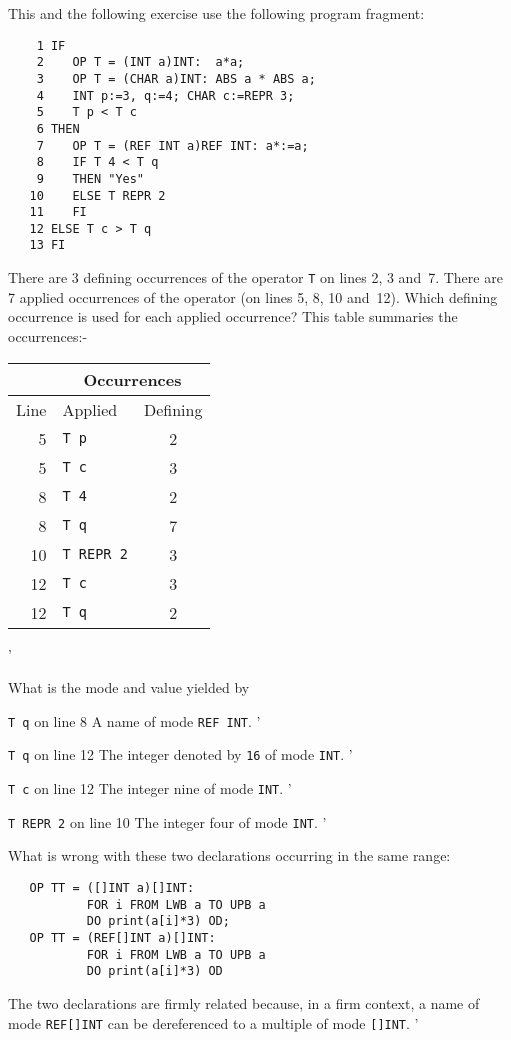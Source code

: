 \begin{exercise}
\item This and the following exercise use the following program
fragment:
\begin{verbatim}
    1 IF
    2    OP T = (INT a)INT:  a*a;
    3    OP T = (CHAR a)INT: ABS a * ABS a;
    4    INT p:=3, q:=4; CHAR c:=REPR 3;
    5    T p < T c
    6 THEN
    7    OP T = (REF INT a)REF INT: a*:=a;
    8    IF T 4 < T q
    9    THEN "Yes"
   10    ELSE T REPR 2
   11    FI
   12 ELSE T c > T q
   13 FI
\end{verbatim}
\noindent
There are 3 defining occurrences of the operator \verb|T| on lines 2,
3 and~7. There are 7 applied occurrences of the operator (on lines 5,
8, 10 and~12). Which defining occurrence is used for each applied
occurrence? \ans This table summaries the occurrences:-
\begin{center}
\begin{tabular}{|r|l|c|}\hline
      &\multicolumn{2}{c|}{Occurrences}\\ \hline
Line  &Applied&Defining\\ \hline
 5    &\texttt{T p}&2\\
 5    &\texttt{T c}&3\\
 8    &\texttt{T 4}&2\\
 8    &\texttt{T q}&7\\
10    &\texttt{T REPR 2}&3\\
12    &\texttt{T c}&3\\
12    &\texttt{T q}&2\\ \hline
\end{tabular}
\end{center}
'
\item What is the mode and value yielded by
\begin{subex}
\item \verb|T q| on line 8 \subans A name of mode \verb|REF INT|.
'
\item \verb|T q| on line 12 \subans The integer denoted by \verb|16| of
mode \verb|INT|.
'
\item \verb|T c| on line 12 \subans The integer nine of mode
\verb|INT|.
'
\item \verb|T REPR 2| on line 10 \subans The integer four of mode
\verb|INT|.
'
\end{subex}
\item What is wrong with these two declarations occurring in the same
range:
\begin{verbatim}
   OP TT = ([]INT a)[]INT:
           FOR i FROM LWB a TO UPB a
           DO print(a[i]*3) OD;
   OP TT = (REF[]INT a)[]INT:
           FOR i FROM LWB a TO UPB a
           DO print(a[i]*3) OD
\end{verbatim}
\indent\ans The two declarations are firmly related because, in a
firm context, a name of mode \verb|REF[]INT| can be dereferenced to a
multiple of mode \verb|[]INT|.
'
\end{exercise}

